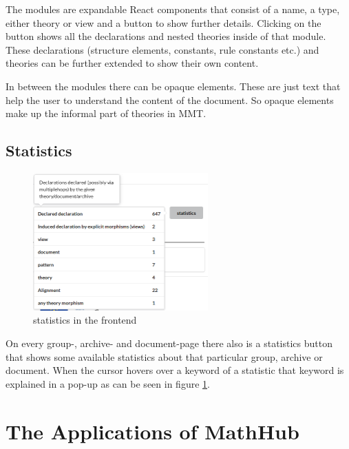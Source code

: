 \documentclass[11pt,a4paper]{article}
\begin{document}
The modules are expandable React components that consist of a name, a type, either theory or view and a button to show further details.
Clicking on the button shows all the declarations and nested theories inside of that module.
These declarations (structure elements, constants, rule constants etc.) and theories can be further extended to show their own content.

In between the modules there can be opaque elements.
These are just text that help the user to understand the content of the document.
So opaque elements make up the informal part of theories in MMT.

\subsection{Statistics}
\begin{figure}[H]
\centerline{\includegraphics[width=0.6\textwidth]{statistics.png}}
\caption{statistics in the frontend}
\label{fig:stats}
\end{figure}
On every group-, archive- and document-page there also is a statistics button that shows some available statistics about that particular group, archive or document.
When the cursor hovers over a keyword of a statistic that keyword is explained in a pop-up as can be seen in figure \ref{fig:stats}.

\section{The Applications of MathHub} \label{apps}
\end{document}
